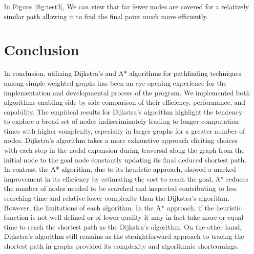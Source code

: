 \documentclass[twocolumn]{article}
\begin{document}
In Figure~\ref{fig:test3}, We can view that far fewer nodes are covered for a relatively similar path allowing it to find the final point much more efficiently.

\section{Conclusion}
In conclusion, utilizing Dijkstra’s and A* algorithms for pathfinding techniques among simple weighted graphs has been an eye-opening experience for the implementation and developmental process of the program. We implemented both algorithms enabling side-by-side comparison of their efficiency, performance, and capability. The empirical results for Dijkstra’s algorithm highlight the tendency to explore a broad set of nodes indiscriminately leading to longer computation times with higher complexity, especially in larger graphs for a greater number of nodes. Dijkstra’s algorithm takes a more exhaustive approach eliciting choices with each step in the nodal expansion during traversal along the graph from the initial node to the goal node constantly updating its final deduced shortest path. In contrast the A* algorithm, due to its heuristic approach, showed a marked improvement in its efficiency by estimating the cost to reach the goal, A* reduces the number of nodes needed to be searched and inspected contributing to less searching time and relative lower complexity than the Dijkstra’s algorithm. However, the limitations of each algorithm. In the A* approach, if the heuristic function is not well defined or of lower quality it may in fact take more or equal time to reach the shortest path as the Dijkstra’s algorithm. On the other hand, Dijkstra’s algorithm still remains as the straightforward approach to tracing the shortest path in graphs provided its complexity and algorithmic shortcomings.
\end{document}
